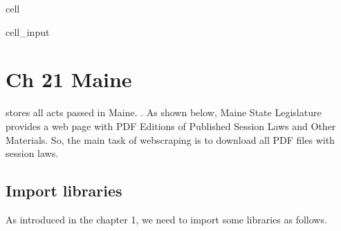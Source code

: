 \documentclass[letterpaper,10pt,english]{jupyterBook}
\begin{document}
\begin{sphinxuseclass}{cell}
\begin{sphinxVerbatimInput}
\begin{sphinxuseclass}{cell_input}
\begin{sphinxVerbatim}[commandchars=\\\{\}]
\end{sphinxVerbatim}

\end{sphinxuseclass}\end{sphinxVerbatimInput}

\end{sphinxuseclass}
\sphinxstepscope


\chapter{Ch 21 Maine}
\label{\detokenize{ch22:ch-21-maine}}\label{\detokenize{ch22::doc}}
\sphinxAtStartPar
{} stores all acts passed in Maine. . As shown below, Maine State Legislature provides a web page with PDF Editions of Published Session Laws and Other Materials. So, the main task of webscraping is to download all PDF files with session laws.

\sphinxAtStartPar
{}


\section{Import libraries}
\label{\detokenize{ch22:import-libraries}}
\sphinxAtStartPar
As introduced in the chapter 1, we need to import some libraries as follows.
\end{document}
